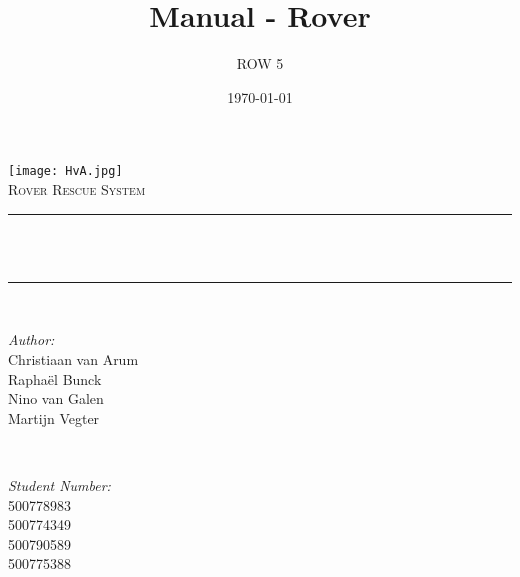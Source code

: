 \title{Manual - Rover}
\author{ROW 5}
\date{\today}

\makeatletter
\let\thetitle\@title
\let\theauthor\@author
\let\thedate\@date
\makeatother

\pagestyle{fancy}
\fancyhf{}
\rhead{\theauthor}
\lhead{\thetitle}
\cfoot{\thepage}


	\begin{titlepage}
		\centering
		\vspace*{0.5 cm}
		\texttt{[image: HvA.jpg]}\\[1.0 cm]
		\textsc{\Large Rover Rescue System}\\[0.5 cm]
		\rule{\linewidth}{0.2 mm} \\[0.4 cm]
		{ \huge \bfseries \thetitle}\\
		\rule{\linewidth}{0.2 mm} \\[1.5 cm]
		
		\begin{minipage}{0.4\textwidth}
			\begin{flushleft} \large
				\emph{Author:}\\
				Christiaan van Arum\\
				Rapha\"el Bunck\\
				Nino van Galen\\
				Martijn Vegter
			\end{flushleft}
		\end{minipage}~
		\begin{minipage}{0.4\textwidth}
			\begin{flushright} \large
				\emph{Student Number:} \\
				500778983\\ %
				500774349\\ %
				500790589\\ %
				500775388	%
			\end{flushright}
		\end{minipage}\\[2 cm]
		
		{\large \thedate}\\[2 cm]
		
		\vfill
		
	\end{titlepage}
